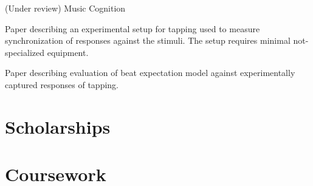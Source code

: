 \documentclass[a4paper]{deedy-resume} %
\begin{document}
\sectionspace

(Under review) Music Cognition

\sectionspace

Paper describing an experimental setup for tapping used to measure
synchronization of responses against the stimuli. The setup requires minimal 
not-specialized equipment.

Paper describing evaluation of beat expectation model against experimentally 
captured responses of tapping.

\sectionspace

\section{Scholarships}


\sectionspace


\section{Coursework}



\sectionspace %
\end{document}
